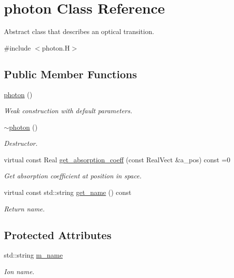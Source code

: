 \hypertarget{classphoton}{}\section{photon Class Reference}
\label{classphoton}


Abstract class that describes an optical transition.  




{\ttfamily \#include $<$photon.\+H$>$}

\subsection*{Public Member Functions}
\begin{DoxyCompactItemize}
\item 
\hyperlink{classphoton_a0a54fc719a0a021333ec6e73b9774a56}{photon} ()
\begin{DoxyCompactList}\small\item\em Weak construction with default parameters. \end{DoxyCompactList}\item 
\hyperlink{classphoton_a7a755b0d3ee0538b259065710ff4c883}{$\sim$photon} ()
\begin{DoxyCompactList}\small\item\em Destructor. \end{DoxyCompactList}\item 
virtual const Real \hyperlink{classphoton_af27d3e2d42987c7c3a13b8f3ac6d8136}{get\+\_\+absorption\+\_\+coeff} (const Real\+Vect \&a\+\_\+pos) const =0
\begin{DoxyCompactList}\small\item\em Get absorption coefficient at position in space. \end{DoxyCompactList}\item 
virtual const std\+::string \hyperlink{classphoton_afa5d9641f77b346744f6b60c9380a68f}{get\+\_\+name} () const 
\begin{DoxyCompactList}\small\item\em Return name. \end{DoxyCompactList}\end{DoxyCompactItemize}
\subsection*{Protected Attributes}
\begin{DoxyCompactItemize}
\item 
std\+::string \hyperlink{classphoton_a6c6744fc204ec3ac04f03f91946dcc96}{m\+\_\+name}
\begin{DoxyCompactList}\small\item\em Ion name. \end{DoxyCompactList}\end{DoxyCompactItemize}


